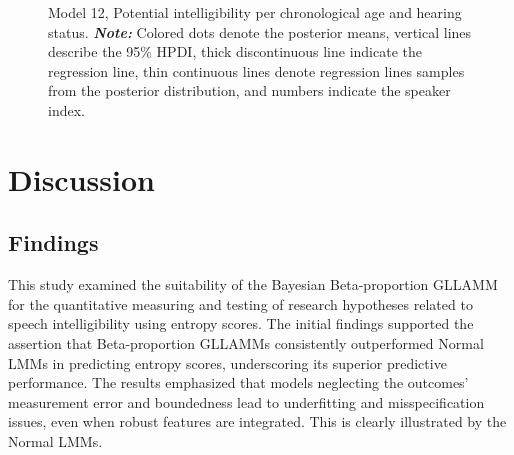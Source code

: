\documentclass[
  authoryear,
  preprint,
  1p]{elsarticle}
\begin{document}
\label{cell-fig-rq3-intelligibility-model12}
\begin{figure}[H]


\caption{\label{fig-rq3-intelligibility-model12}Model 12, Potential
intelligibility per chronological age and hearing status.
{\textbf{\emph{Note:}} Colored dots denote the posterior means, vertical
lines describe the 95\% HPDI, thick discontinuous line indicate the
regression line, thin continuous lines denote regression lines samples
from the posterior distribution, and numbers indicate the speaker
index.}}

\end{figure}%

\section{Discussion}\label{sec-discussion}

\subsection{Findings}\label{sec-D-F}

{This study examined the suitability of the Bayesian Beta-proportion
GLLAMM for the quantitative measuring and testing of research hypotheses
related to speech intelligibility using entropy scores.} The initial
findings supported the assertion that Beta-proportion GLLAMMs
consistently outperformed Normal LMMs in predicting entropy scores,
underscoring its superior predictive performance. The results emphasized
that models neglecting the outcomes' measurement error and boundedness
lead to underfitting and misspecification issues, even when robust
features are integrated. This is clearly illustrated by the Normal LMMs.
\end{document}
